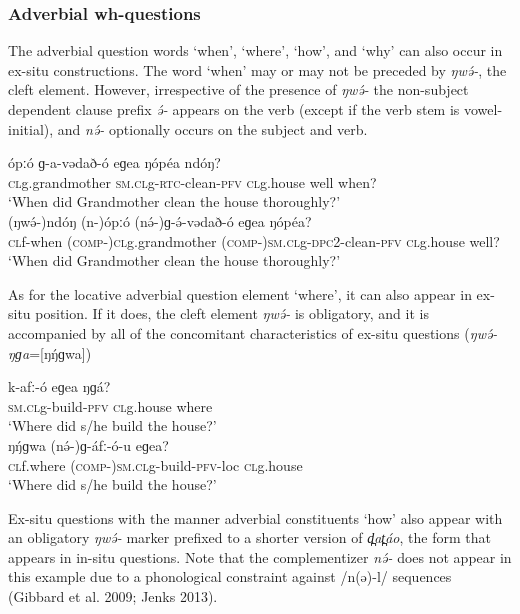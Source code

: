 \subsubsection{Adverbial wh-questions}
The adverbial question words ‘when’, ‘where’, ‘how’, and ‘why’ can also occur in ex-situ constructions. The word ‘when’ may or may not be preceded by \textit{ŋwə́-}, the cleft element. However, irrespective of the presence of \textit{ŋwə́-} the non-subject dependent clause prefix \textit{ə́-} appears on the verb (except if the verb stem is vowel-initial), and \textit{nə́-} optionally occurs on the subject and verb. 

\ea
\ea
\gll	ópːó	ɡ-a-vədað-ó	eɡea        ŋópéa   ndóŋ?\\
	\textsc{cl}g.grandmother	\textsc{sm.cl}g-\textsc{rtc}-clean-\textsc{pfv}	\textsc{cl}g.house	well	when?\\
\trans		‘When did Grandmother clean the house thoroughly?’\\
\ex
\gll	(ŋwə́-)ndóŋ	(n-)ópːó	(nə́-)ɡ-ə́-vədað-ó eɡea	ŋópéa?  \\               
	\textsc{cl}f-when	(\textsc{comp-})\textsc{cl}g.grandmother	(\textsc{comp-})\textsc{sm.cl}g-\textsc{dpc}2-clean-\textsc{pfv} 
\textsc{cl}g.house	well?\\
\trans		‘When did Grandmother clean the house thoroughly?’\\
\z
\z

As for the locative adverbial question element ‘where’, it can also appear in ex-situ position. If it does, the cleft element \textit{ŋwə́-} is obligatory, and it is accompanied by all of the concomitant characteristics of ex-situ questions (\textit{ŋwə́-ŋɡa}=[ŋŋ́ɡwa])       

\ea
\ea \gll	k-afː-ó	eɡea	ŋɡá?\\
		\textsc{sm.cl}g-build-\textsc{pfv}	\textsc{cl}g.house	where\\
\trans		‘Where did s/he build the house?’\\
\ex \gll	ŋŋ́ɡwa	(nə́-)ɡ-áfː-ó-u	eɡea?\\
		\textsc{cl}f.where	(\textsc{comp-})\textsc{sm.cl}g-build-\textsc{pfv}-loc	\textsc{cl}g.house\\
\trans		‘Where did s/he build the house?’\\
\z
\z

Ex-situ questions with the manner adverbial constituents ‘how’ also appear with an obligatory \textit{ŋwə́-} marker prefixed to a shorter version of \textit{d̪at̪áo}, the form that appears in in-situ questions. Note that the complementizer \textit{nə́-} does not appear in this example due to a phonological constraint against /n(ə)-l/ sequences (Gibbard et al. 2009; Jenks 2013). 

